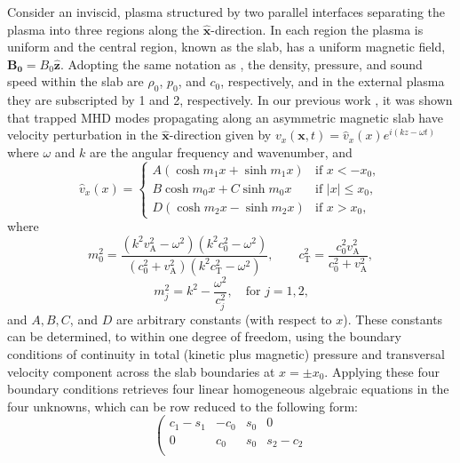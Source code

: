 \documentclass[namedreferences]{solarphysics}
\numberwithin{equation}{section}
\begin{document}
\begin{article}
Consider an inviscid, plasma structured by two parallel interfaces separating the plasma into three regions along the $\mathbf{\widehat{x}}$-direction. In each region the plasma is uniform and the central region, known as the slab, has a uniform magnetic field, $\mathbf{B_0} = B_0 \mathbf{\widehat{z}}$. Adopting the same notation as \cite{all_etal17}, the density, pressure, and sound speed within the slab are $\rho_0$, $p_0$, and $c_0$, respectively, and in the external plasma they are subscripted by 1 and 2, respectively. In our previous work \citep{all_etal17}, it was shown that trapped MHD modes propagating along an asymmetric magnetic slab have velocity perturbation in the $\mathbf{\widehat{x}}$-direction given by $v_x(\mathbf{x}, t) = \widehat{v}_x(x)e^{i(kz-\omega t)}$ where $\omega$ and $k$ are the angular frequency and wavenumber, and
\begin{equation}
\widehat{v}_x(x)=
\begin{cases}
A(\cosh{m_1x}+\sinh{m_1x}) & \text{if }x<-x_0, \\
B\cosh{m_0x}+C\sinh{m_0x} & \text{if }|x|\leq{x_0}, \\
D(\cosh{m_2x}-\sinh{m_2x}) & \text{if  }x>x_0, \label{vsoln}
\end{cases}
\end{equation}
where
\begin{equation}
m_0^2=\frac{(k^2v_\textrm{A}^2-\omega^2)(k^2c_0^2-\omega^2)}{(c_0^2+v_\textrm{A}^2)(k^2c_\textrm{T}^2-\omega^2)}, \qquad c_\textrm{T}^2=\frac{c_0^2v_\textrm{A}^2}{c_0^2+v_\textrm{A}^2}, \label{m0}
\end{equation}
\begin{equation}
m_j^2=k^2-\frac{\omega^2}{c_j^2}, \quad \text{for $j=1,2$,} \label{m1/2}
\end{equation}
and $A, B, C$, and $D$ are arbitrary constants (with respect to $x$). These constants can be determined, to within one degree of freedom, using the boundary conditions of continuity in total (kinetic plus magnetic) pressure and transversal velocity component across the slab boundaries at $x = \pm x_0$. Applying these four boundary conditions retrieves four linear homogeneous algebraic equations in the four unknowns, which can be row reduced to the following form:
\begin{equation}
\left(
\begin{matrix}
c_1-s_1 &-c_0                       &s_0                        &0 \\
0       &c_0                        &s_0                        &s_2-c_2 \\

\end{matrix}
\end{equation}
\end{article}
\end{document}
